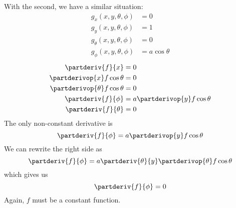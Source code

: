 With the second, we have a similar situation:
\begin{align*}
g_x(x, y, \theta, \phi) &= 0 \\
g_y(x, y, \theta, \phi) &= 1 \\
g_{\theta}(x, y, \theta, \phi) &= 0 \\
g_{\phi}(x, y, \theta, \phi) &= a\cos\theta
\end{align*}
\begin{align*}
\partderiv{f}{x} &= 0 \\
\partderivop{x}f\cos\theta &= 0 \\
\partderivop{\theta}f\cos\theta &= 0 \\
\partderiv{f}{\phi} &= a\partderivop{y}f\cos\theta \\
\partderiv{f}{\theta} &= 0
\end{align*}
The only non-constant derivative is
\[\partderiv{f}{\phi} = a\partderivop{y}f\cos\theta\]
We can rewrite the right side as
\[
\partderiv{f}{\phi}
=
a\partderiv{\theta}{y}\partderivop{\theta}f\cos\theta
\]
which gives us
\[\partderiv{f}{\phi} = 0\]
Again, $f$ must be a constant function.
